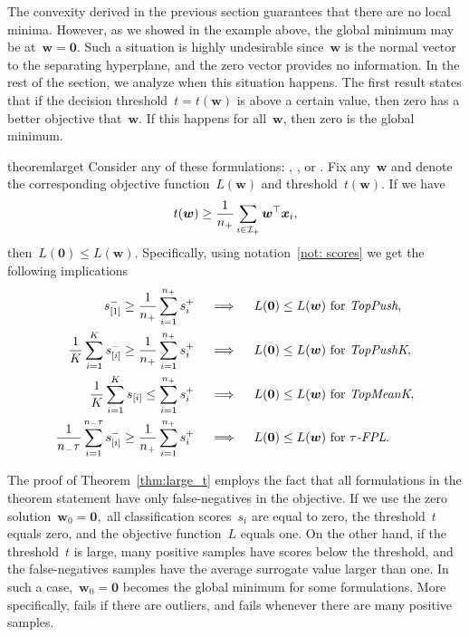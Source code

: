 The convexity derived in the previous section guarantees that there are no local minima. However, as we showed in the example above, the global minimum may be at~$\bm{w} = \bm{0}$. Such a situation is highly undesirable since~$\bm{w}$ is the normal vector to the separating hyperplane, and the zero vector provides no information. In the rest of the section, we analyze when this situation happens. The first result states that if the decision threshold~$t = t(\bm{w})$ is above a certain value, then zero has a better objective that~$\bm{w}$. If this happens for all~$\bm{w}$, then zero is the global minimum.

\begin{restatable}{theorem}{larget}\label{thm:large_t}
  Consider any of these formulations: \TopPush, \TopPushK, \TopMeanK or \tauFPL. Fix any~$\bm{w}$ and denote the corresponding objective function~$L(\bm{w})$ and threshold~$t(\bm{w})$. If we have
  \begin{equation}\label{eq:w_zero_nn}
    t(\bm{w})\geq \frac{1}{n_{+}} \sum_{i \in \mathcal{I}_{+}} \bm{w}^{\top} \bm{x}_i,
  \end{equation}
  then~$L(\bm{0}) \leq L(\bm{w})$. Specifically, using notation~\ref{not: scores} we get the following implications
  \begin{align*}\label{eq:w_zero}
    s_{[1]}^- \geq \frac{1}{n_{+}} \sum_{i=1}^{n_{+}} s_{i}^+ \quad
      & \implies \quad L(\bm{0}) \leq L(\bm{w}) \text{ for } \emph{TopPush}, \\
    \frac{1}{K}\sum_{i=1}^K s_{[i]}^- \geq \frac{1}{n_{+}} \sum_{i=1}^{n_{+}} s_{i}^+  \quad
      & \implies \quad L(\bm{0}) \leq L(\bm{w}) \text{ for } \emph{TopPushK}, \\
    \frac{1}{K} \sum_{i=1}^{K} s_{[i]} \leq \sum_{i=1}^{n_{+}} s_{i}^+ \quad
      & \implies \quad L(\bm{0}) \leq L(\bm{w}) \text{ for } \emph{TopMeanK}, \\
    \frac{1}{n_{-}\tau} \sum_{i=1}^{n_{-}\tau} s_{[i]}^- \geq \frac{1}{n_{+}}\sum_{i=1}^{n_{+}} s_{i}^+ \quad
      & \implies \quad L(\bm{0}) \leq L(\bm{w}) \text{ for } {\emph{$\tau$-FPL}}. \\
  \end{align*}
\end{restatable}

The proof of Theorem~\ref{thm:large_t} employs the fact that all formulations in the theorem statement have only false-negatives in the objective. If we use the zero solution~$\bm{w}_0=\bm{0},$ all classification scores~$s_i$ are equal to zero, the threshold~$t$ equals zero, and the objective function~$L$ equals one. On the other hand, if the threshold~$t$ is large, many positive samples have scores below the threshold, and the false-negatives samples have the average surrogate value larger than one. In such a case,~$\bm{w}_0 = \bm{0}$ becomes the global minimum for some formulations. More specifically, \TopPush fails if there are outliers, and \TopMeanK fails whenever there are many positive samples.

